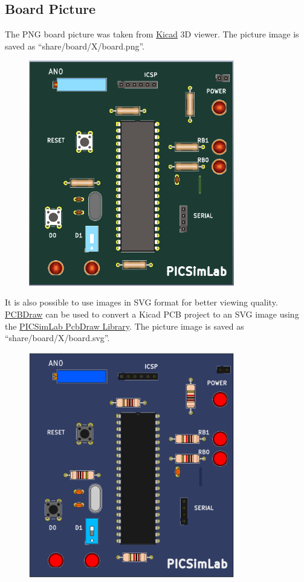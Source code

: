\pagebreak
\subsection{Board Picture}

The PNG board picture was taken from \href{http://kicad-pcb.org/}{Kicad} 3D viewer.
The picture image is saved as ``share/board/X/board.png''.

\begin{figure}[H]
\center
\includegraphics[width=0.8\textwidth]{files/share/board.png} 
\end{figure} 

It is also possible to use images in SVG format for better viewing quality. 
\href{https://github.com/yaqwsx/PcbDraw}{PCBDraw} can be used to convert a Kicad PCB project to 
an SVG image using the \href{https://github.com/lcgamboa/PcbDrawPICSimLab}{PICSimLab PcbDraw Library}. 
The picture image is saved as ``share/board/X/board.svg''.
\begin{figure}[H]
\center
\includegraphics[width=0.8\textwidth]{files/share/board_svg.png} 
\end{figure} 

